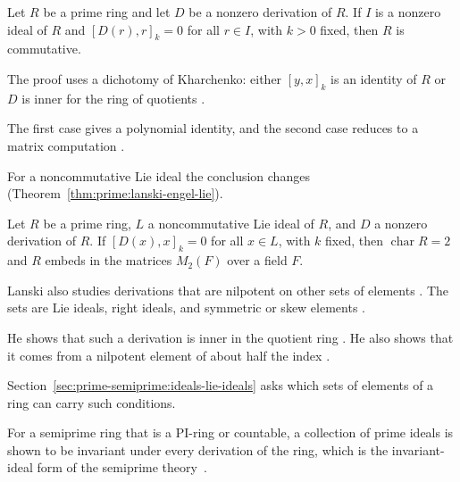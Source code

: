 \begin{theorem}\label{thm:prime:lanski-engel}
Let $R$ be a prime ring and let $D$ be a nonzero derivation of $R$. If $I$ is a
nonzero ideal of $R$ and $[D(r),r]_k=0$ for all $r\in I$, with $k>0$ fixed, then
$R$ is commutative.
\end{theorem}

The proof uses a dichotomy of Kharchenko: either $[y,x]_k$ is an identity of $R$
or $D$ is inner for the ring of quotients \cite[p.~732]{Lanski1993}.

The first case gives a polynomial identity, and the second case reduces to a
matrix computation \cite[p.~732]{Lanski1993}.

For a noncommutative Lie ideal the conclusion changes (Theorem~\ref{thm:prime:lanski-engel-lie}).

\begin{theorem}\label{thm:prime:lanski-engel-lie}
Let $R$ be a prime ring, $L$ a noncommutative Lie ideal of $R$, and $D$ a nonzero
derivation of $R$. If $[D(x),x]_k=0$ for all $x\in L$, with $k$ fixed, then
$\operatorname{char}R=2$ and $R$ embeds in the matrices $M_2(F)$ over a field $F$.
\end{theorem}

Lanski also studies derivations that are nilpotent on other sets of elements
\cite[p.~1427]{Lanski1992}. The sets are Lie ideals, right ideals, and symmetric
or skew elements \cite[p.~1427]{Lanski1992}.

He shows that such a derivation is inner in the quotient ring
\cite[p.~1427]{Lanski1992}. He also shows that it comes from a nilpotent element
of about half the index \cite[p.~1427]{Lanski1992}.

Section~\ref{sec:prime-semiprime:ideals-lie-ideals} asks which sets of elements
of a ring can carry such conditions.

For a semiprime ring that is a PI-ring or countable, a collection of prime ideals is shown to be invariant under every derivation of the ring, which is the invariant-ideal form of the semiprime theory~\cite{WlSemiprimeRingsWithPrimeIdealsI2018}.
